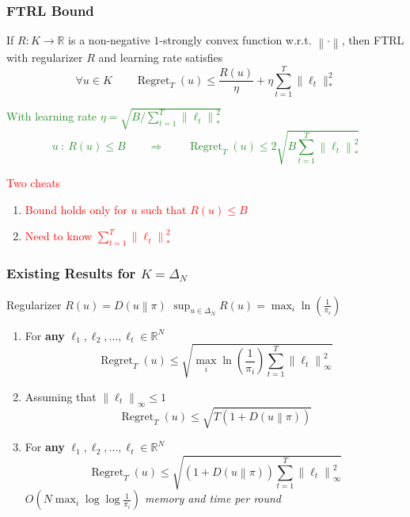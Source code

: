 \documentclass[usenames,dvipsnames]{beamer}
\DeclareMathOperator{\Regret}{Regret}
\newcommand{\R}{\mathbb{R}}
\newcommand{\norm}[1]{\left\|#1\right\|}
\newcommand{\KL}[2]{D\left({#1}\middle\|{#2}\right)}
\newcommand{\Cite}[1]{{\tiny \textcolor{Blue}{[#1]}}}
\begin{document}
\begin{frame}
\frametitle{FTRL Bound}

\begin{theorem}[\textcolor{Blue}{CBL'06, SS'11}]
If $R:K \to \R$ is a non-negative $1$-strongly convex function w.r.t. $\norm{\cdot}$, then FTRL
with regularizer $R$ and learning rate satisfies
$$
\forall u \in K \qquad  \Regret_T(u) \le \frac{R(u)}{\eta} + \eta \sum_{t=1}^T \|\ell_t\|_*^2
$$
\end{theorem}

\textcolor{ForestGreen}{
With learning rate $\eta = \sqrt{B/\sum_{t=1}^T \norm{\ell_t}_*^2}$
$$
u \ : \ R(u) \le B \qquad \Longrightarrow \qquad \Regret_T(u) \le 2 \sqrt{B \sum_{t=1}^T \norm{\ell_t}_*^2}
$$}

\textcolor{red}{Two cheats}
\begin{enumerate}
\item \textcolor{red}{Bound holds only for $u$ such that $R(u) \le B$}
\item \textcolor{red}{Need to know $\sum_{t=1}^T \norm{\ell_t}_*^2$}
\end{enumerate}

\end{frame}

\begin{frame}
\frametitle{Existing Results for $K=\Delta_N$}

Regularizer $R(u) = \KL{u}{\pi}$ \qquad $\sup_{u \in \Delta_N} R(u) = \max_{i} \ln\left(\frac{1}{\pi_i} \right)$

\vspace{0.5cm}

\begin{enumerate}

\item For \textbf{any} $\ell_1, \ell_2, \dots, \ell_t \in \R^N$ \qquad \Cite{deREGK'11, OP'15}
$$
\Regret_T(u) \le \sqrt{\max_i \ln \left( \frac{1}{\pi_i} \right) \sum_{t=1}^T \norm{\ell_t}_\infty^2}
$$

\item Assuming that $\norm{\ell_t}_\infty \le 1$ \qquad \Cite{CFH'09, CV'10, LS'14, LS'15, KE'15, FRS'15, OP'16}
$$
\Regret_T(u) \le \sqrt{T \left(1 + \KL{u}{\pi}\right)}
$$

\item For \textbf{any} $\ell_1, \ell_2, \dots, \ell_t \in \R^N$ \qquad  \Cite{FRS'15+OP'16}
$$
\Regret_T(u) \le \sqrt{(1 + \KL{u}{\pi}) \sum_{t=1}^T \norm{\ell_t}_\infty^2}
$$
\emph{$O(N \max_{i} \log \log \frac{1}{\pi_i})$ memory and time per round}
\end{enumerate}
\end{frame}
\end{document}
